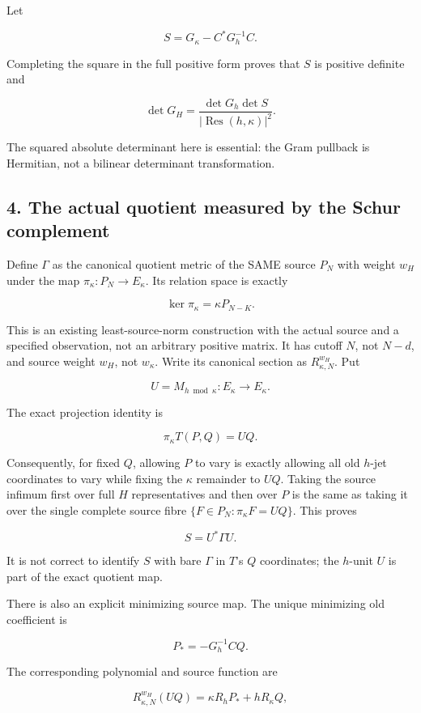 Let

\[S=G_\kappa-C^*G_h^{-1}C.\]

Completing the square in the full positive form proves that \(S\) is positive
definite and

\[\det G_H=\frac{\det G_h\det S}{|\operatorname{Res}(h,\kappa)|^2}.\]

The squared absolute determinant here is essential: the Gram pullback
is Hermitian, not a bilinear determinant transformation.

\subsection*{4. The actual quotient measured by the Schur complement}

Define \(\Gamma\) as the canonical quotient metric of the SAME source \(P_N\) with
weight \(w_H\) under the map \(\pi_\kappa:P_N\longrightarrow E_\kappa\). Its relation space
is exactly

\[\ker\pi_\kappa=\kappa P_{N-K}.\]

This is an existing least-source-norm construction with the actual
source and a specified observation, not an arbitrary positive matrix.
It has cutoff \(N\), not \(N-d\), and source weight \(w_H\), not \(w_\kappa\). Write
its canonical section as \(R^{w_H}_{\kappa,N}\). Put

\[U=M_{h\bmod\kappa}:E_\kappa\longrightarrow E_\kappa.\]

The exact projection identity is

\[\pi_\kappa T(P,Q)=UQ.\]

Consequently, for fixed \(Q\), allowing \(P\) to vary is exactly allowing all old
\(h\)-jet coordinates to vary while fixing the \(\kappa\) remainder to \(UQ\). Taking
the source infimum first over full \(H\) representatives and then over \(P\) is
the same as taking it over the single complete source fibre
\(\{F\in P_N:\pi_\kappa F=UQ\}\). This proves

\[S=U^*\Gamma U.\]

It is not correct to identify \(S\) with bare \(\Gamma\) in \(T\)'s \(Q\) coordinates;
the \(h\)-unit \(U\) is part of the exact quotient map.

There is also an explicit minimizing source map. The unique minimizing
old coefficient is

\[P_*=-G_h^{-1}CQ.\]

The corresponding polynomial and source function are

\[R^{w_H}_{\kappa,N}(UQ)=\kappa R_hP_*+hR_\kappa Q,\]

